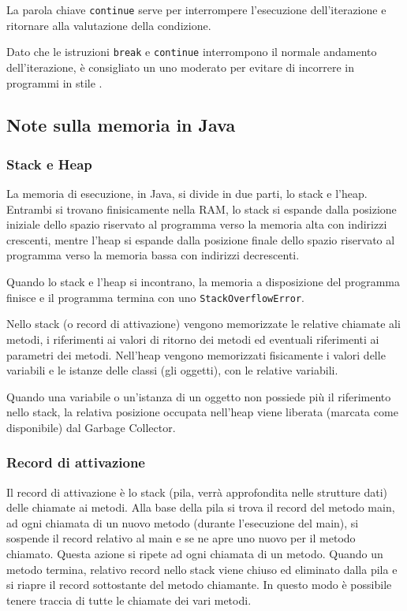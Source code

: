 \documentclass{article}
\begin{document}
La parola chiave \verb|continue| serve per interrompere l'esecuzione dell'iterazione e ritornare alla valutazione della condizione.

Dato che le istruzioni \verb|break| e \verb|continue| interrompono il normale andamento dell'iterazione, è consigliato un uno moderato
per evitare di incorrere in programmi in stile . 

\newpage


\subsection{Note sulla memoria in Java}
\subsubsection*{Stack e Heap}
La memoria di esecuzione, in Java, si divide in due parti, lo stack e l'heap. Entrambi si trovano finisicamente nella RAM, lo stack
si espande dalla posizione iniziale dello spazio riservato al programma verso la memoria alta con indirizzi crescenti, mentre l'heap
si espande dalla posizione finale dello spazio riservato al programma verso la memoria bassa con indirizzi decrescenti.

Quando lo stack e l'heap si incontrano, la memoria a disposizione del programma finisce e il programma termina con uno \verb|StackOverflowError|.

Nello stack (o record di attivazione) vengono memorizzate le relative chiamate ali metodi, i riferimenti ai valori di ritorno dei
metodi ed eventuali riferimenti ai parametri dei metodi. Nell'heap vengono memorizzati fisicamente i valori delle variabili e le
istanze delle classi (gli oggetti), con le relative variabili.

Quando una variabile o un'istanza di un oggetto non possiede più il riferimento nello stack, la relativa posizione occupata nell'heap
viene liberata (marcata come disponibile) dal Garbage Collector.

\subsubsection*{Record di attivazione}
Il record di attivazione è lo stack (pila, verrà approfondita nelle strutture dati) delle chiamate ai metodi.
Alla base della pila si trova il record del metodo main, ad ogni chiamata di un nuovo metodo (durante l'esecuzione del main),
si sospende il record relativo al main e se ne apre uno nuovo per il metodo chiamato. Questa azione si ripete ad ogni chiamata
di un metodo.
Quando un metodo termina, relativo record nello stack viene chiuso ed eliminato dalla pila e si riapre il record sottostante del
metodo chiamante.
In questo modo è possibile tenere traccia di tutte le chiamate dei vari metodi.
\end{document}

